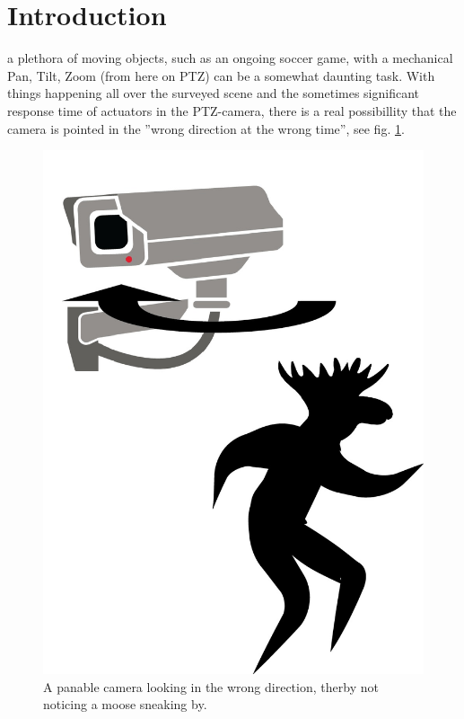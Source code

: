 \section{Introduction}


 a plethora of moving objects, such as an ongoing soccer game, with a mechanical Pan, Tilt, Zoom (from here on PTZ) can be a somewhat daunting task.
With things happening all over the surveyed scene and the sometimes significant response time of actuators in the PTZ-camera, there is a real possibillity that the camera is pointed in the ''wrong direction at the wrong time'', see fig. \ref{fig:problem}.

\begin{figure}[H]
	\centering
	\includegraphics[width=0.5 \columnwidth]{../results/images/PTZ_problem.jpg}
	\caption{A panable camera looking in the wrong direction, therby not noticing a moose sneaking by.}
	\label{fig:problem}
\end{figure}

